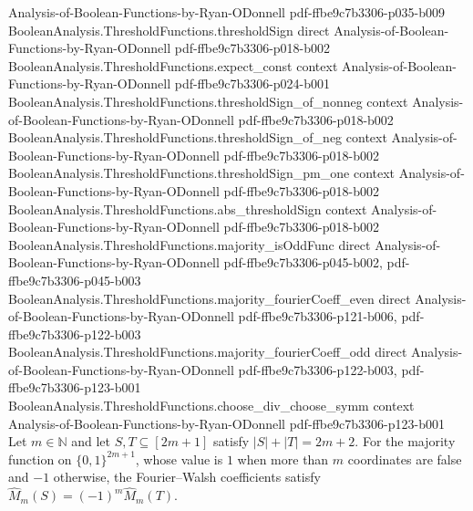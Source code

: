 \begin{theorem}
  {Analysis-of-Boolean-Functions-by-Ryan-ODonnell}
  {pdf-ffbe9c7b3306-p035-b009}
\proofstep
  {BooleanAnalysis.ThresholdFunctions.thresholdSign}
  {direct}
  {Analysis-of-Boolean-Functions-by-Ryan-ODonnell}
  {pdf-ffbe9c7b3306-p018-b002}
\proofstep
  {BooleanAnalysis.ThresholdFunctions.expect_const}
  {context}
  {Analysis-of-Boolean-Functions-by-Ryan-ODonnell}
  {pdf-ffbe9c7b3306-p024-b001}
\proofstep
  {BooleanAnalysis.ThresholdFunctions.thresholdSign_of_nonneg}
  {context}
  {Analysis-of-Boolean-Functions-by-Ryan-ODonnell}
  {pdf-ffbe9c7b3306-p018-b002}
\proofstep
  {BooleanAnalysis.ThresholdFunctions.thresholdSign_of_neg}
  {context}
  {Analysis-of-Boolean-Functions-by-Ryan-ODonnell}
  {pdf-ffbe9c7b3306-p018-b002}
\proofstep
  {BooleanAnalysis.ThresholdFunctions.thresholdSign_pm_one}
  {context}
  {Analysis-of-Boolean-Functions-by-Ryan-ODonnell}
  {pdf-ffbe9c7b3306-p018-b002}
\proofstep
  {BooleanAnalysis.ThresholdFunctions.abs_thresholdSign}
  {context}
  {Analysis-of-Boolean-Functions-by-Ryan-ODonnell}
  {pdf-ffbe9c7b3306-p018-b002}
\proofstep
  {BooleanAnalysis.ThresholdFunctions.majority_isOddFunc}
  {direct}
  {Analysis-of-Boolean-Functions-by-Ryan-ODonnell}
  {pdf-ffbe9c7b3306-p045-b002,
    pdf-ffbe9c7b3306-p045-b003}
\proofstep
  {BooleanAnalysis.ThresholdFunctions.majority_fourierCoeff_even}
  {direct}
  {Analysis-of-Boolean-Functions-by-Ryan-ODonnell}
  {pdf-ffbe9c7b3306-p121-b006,
    pdf-ffbe9c7b3306-p122-b003}
\proofstep
  {BooleanAnalysis.ThresholdFunctions.majority_fourierCoeff_odd}
  {direct}
  {Analysis-of-Boolean-Functions-by-Ryan-ODonnell}
  {pdf-ffbe9c7b3306-p122-b003,
    pdf-ffbe9c7b3306-p123-b001}
\proofstep
  {BooleanAnalysis.ThresholdFunctions.choose_div_choose_symm}
  {context}
  {Analysis-of-Boolean-Functions-by-Ryan-ODonnell}
  {pdf-ffbe9c7b3306-p123-b001}
Let $m\in\mathbb N$ and let $S,T\subseteq[2m+1]$ satisfy $|S|+|T|=2m+2$. For the
majority function on $\{0,1\}^{2m+1}$, whose value is $1$ when more than $m$ coordinates
are false and $-1$ otherwise, the Fourier--Walsh coefficients satisfy $\widehat
M_m(S)=(-1)^m\widehat M_m(T)$.
\end{theorem}

